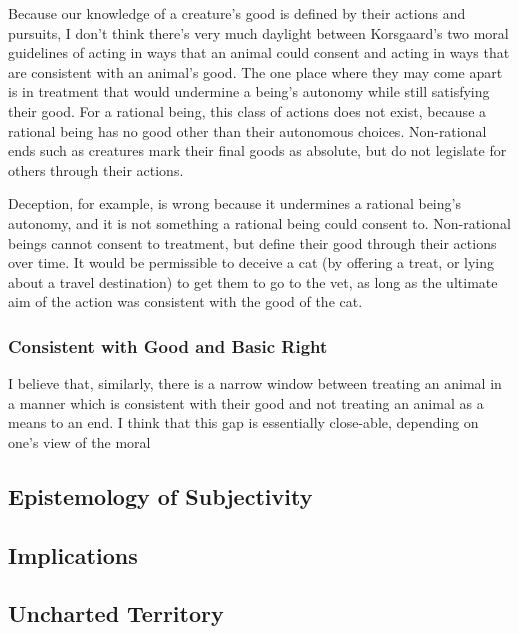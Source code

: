 \documentclass[12pt]{article}
\begin{document}
			Because our knowledge of a creature’s good is defined by their
			actions and pursuits, I don’t think there’s very much daylight
			between Korsgaard’s two moral guidelines of acting in ways that an
			animal could consent and acting in ways that are consistent with an
			animal’s good.  The one place where they may come apart is in
			treatment that would undermine a being’s autonomy while still
			satisfying their good.  For a rational being, this class of actions
			does not exist, because a rational being has no good other than
			their autonomous choices.  Non-rational ends such as creatures mark
			their final goods as absolute, but do not legislate for others
			through their actions.

			Deception, for example, is wrong because it undermines a rational
			being’s autonomy, and it is not something a rational being could
			consent to. Non-rational beings cannot consent to treatment, but
			define their good through their actions over time. It would be
			permissible to deceive a cat (by offering a treat, or lying about a
			travel destination) to get them to go to the vet, as long as the
			ultimate aim of the action was consistent with the good of the cat.

		\subsubsection{Consistent with Good and Basic Right}
			
			I believe that, similarly, there is a narrow window between
			treating an animal in a manner which is consistent with their good
			and not treating an animal as a means to an end.  I think that this
			gap is essentially close-able, depending on one’s view of the moral

	\subsection{Epistemology of Subjectivity}
	\subsection{Implications}
	\subsection{Uncharted Territory}
\end{document}
